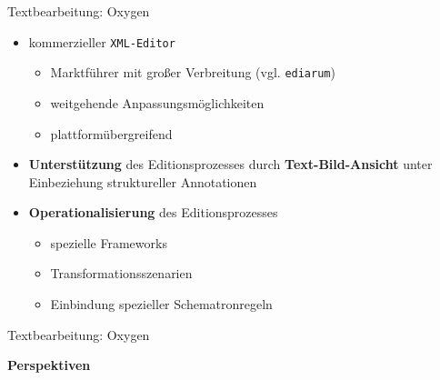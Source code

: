 \documentclass{bbawslides}
\begin{document}
\begin{bbawslide}{Textbearbeitung: Oxygen}
  \vspace*{7mm}%
  \centerslidestrue%
  \begin{itemize}
    \item kommerzieller \texttt{XML-Editor}
    \begin{itemize}
      \item Marktführer mit großer Verbreitung (vgl. \texttt{ediarum})
      \item weitgehende Anpassungsmöglichkeiten
      \item plattformübergreifend    
    \end{itemize}
    \item \textbf{Unterstützung} des Editionsprozesses durch \textbf{Text-Bild-Ansicht} unter Einbeziehung struktureller Annotationen
    \item \textbf{Operationalisierung} des Editionsprozesses
    \begin{itemize}
      \item spezielle Frameworks
      \item Transformationsszenarien
      \item Einbindung spezieller Schematronregeln
    \end{itemize}
  \end{itemize}
\end{bbawslide}

\begin{bbawslide}{Textbearbeitung: Oxygen}
  \begin{center}
  \end{center}
\end{bbawslide}

\begin{bbawpart}{\Large\bf Perspektiven}
\end{bbawpart}
\end{document}
